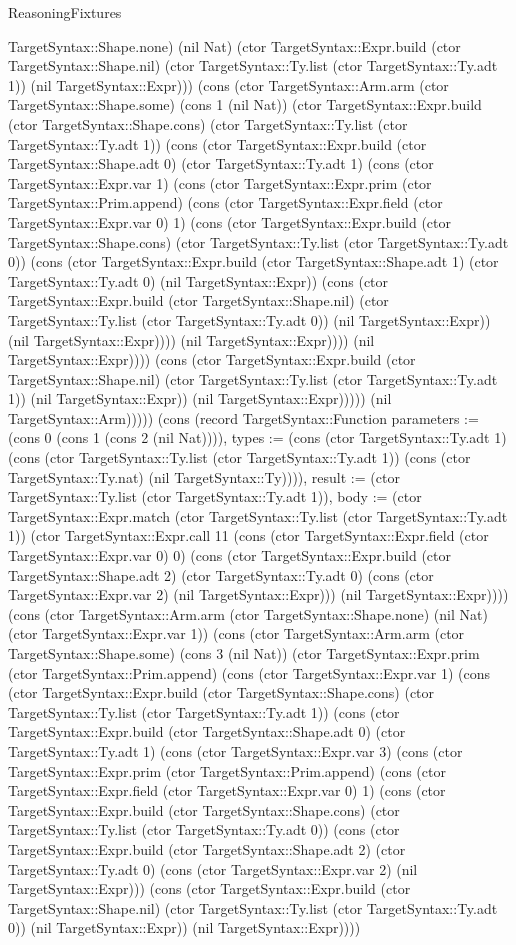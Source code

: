 \begin{lexlean}{ReasoningFixtures}
\begin{semanticmodule}
{TargetSyntax::Shape.none) (nil Nat) (ctor TargetSyntax::Expr.build (ctor TargetSyntax::Shape.nil) (ctor TargetSyntax::Ty.list (ctor TargetSyntax::Ty.adt 1)) (nil TargetSyntax::Expr))) (cons (ctor TargetSyntax::Arm.arm (ctor TargetSyntax::Shape.some) (cons 1 (nil Nat)) (ctor TargetSyntax::Expr.build (ctor TargetSyntax::Shape.cons) (ctor TargetSyntax::Ty.list (ctor TargetSyntax::Ty.adt 1)) (cons (ctor TargetSyntax::Expr.build (ctor TargetSyntax::Shape.adt 0) (ctor TargetSyntax::Ty.adt 1) (cons (ctor TargetSyntax::Expr.var 1) (cons (ctor TargetSyntax::Expr.prim (ctor TargetSyntax::Prim.append) (cons (ctor TargetSyntax::Expr.field (ctor TargetSyntax::Expr.var 0) 1) (cons (ctor TargetSyntax::Expr.build (ctor TargetSyntax::Shape.cons) (ctor TargetSyntax::Ty.list (ctor TargetSyntax::Ty.adt 0)) (cons (ctor TargetSyntax::Expr.build (ctor TargetSyntax::Shape.adt 1) (ctor TargetSyntax::Ty.adt 0) (nil TargetSyntax::Expr)) (cons (ctor TargetSyntax::Expr.build (ctor TargetSyntax::Shape.nil) (ctor TargetSyntax::Ty.list (ctor TargetSyntax::Ty.adt 0)) (nil TargetSyntax::Expr)) (nil TargetSyntax::Expr)))) (nil TargetSyntax::Expr)))) (nil TargetSyntax::Expr)))) (cons (ctor TargetSyntax::Expr.build (ctor TargetSyntax::Shape.nil) (ctor TargetSyntax::Ty.list (ctor TargetSyntax::Ty.adt 1)) (nil TargetSyntax::Expr)) (nil TargetSyntax::Expr))))) (nil TargetSyntax::Arm))))}) (cons (record TargetSyntax::Function {parameters := (cons 0 (cons 1 (cons 2 (nil Nat)))), types := (cons (ctor TargetSyntax::Ty.adt 1) (cons (ctor TargetSyntax::Ty.list (ctor TargetSyntax::Ty.adt 1)) (cons (ctor TargetSyntax::Ty.nat) (nil TargetSyntax::Ty)))), result := (ctor TargetSyntax::Ty.list (ctor TargetSyntax::Ty.adt 1)), body := (ctor TargetSyntax::Expr.match (ctor TargetSyntax::Ty.list (ctor TargetSyntax::Ty.adt 1)) (ctor TargetSyntax::Expr.call 11 (cons (ctor TargetSyntax::Expr.field (ctor TargetSyntax::Expr.var 0) 0) (cons (ctor TargetSyntax::Expr.build (ctor TargetSyntax::Shape.adt 2) (ctor TargetSyntax::Ty.adt 0) (cons (ctor TargetSyntax::Expr.var 2) (nil TargetSyntax::Expr))) (nil TargetSyntax::Expr)))) (cons (ctor TargetSyntax::Arm.arm (ctor TargetSyntax::Shape.none) (nil Nat) (ctor TargetSyntax::Expr.var 1)) (cons (ctor TargetSyntax::Arm.arm (ctor TargetSyntax::Shape.some) (cons 3 (nil Nat)) (ctor TargetSyntax::Expr.prim (ctor TargetSyntax::Prim.append) (cons (ctor TargetSyntax::Expr.var 1) (cons (ctor TargetSyntax::Expr.build (ctor TargetSyntax::Shape.cons) (ctor TargetSyntax::Ty.list (ctor TargetSyntax::Ty.adt 1)) (cons (ctor TargetSyntax::Expr.build (ctor TargetSyntax::Shape.adt 0) (ctor TargetSyntax::Ty.adt 1) (cons (ctor TargetSyntax::Expr.var 3) (cons (ctor TargetSyntax::Expr.prim (ctor TargetSyntax::Prim.append) (cons (ctor TargetSyntax::Expr.field (ctor TargetSyntax::Expr.var 0) 1) (cons (ctor TargetSyntax::Expr.build (ctor TargetSyntax::Shape.cons) (ctor TargetSyntax::Ty.list (ctor TargetSyntax::Ty.adt 0)) (cons (ctor TargetSyntax::Expr.build (ctor TargetSyntax::Shape.adt 2) (ctor TargetSyntax::Ty.adt 0) (cons (ctor TargetSyntax::Expr.var 2) (nil TargetSyntax::Expr))) (cons (ctor TargetSyntax::Expr.build (ctor TargetSyntax::Shape.nil) (ctor TargetSyntax::Ty.list (ctor TargetSyntax::Ty.adt 0)) (nil TargetSyntax::Expr)) (nil TargetSyntax::Expr)))) }
\end{semanticmodule}
\end{lexlean}
